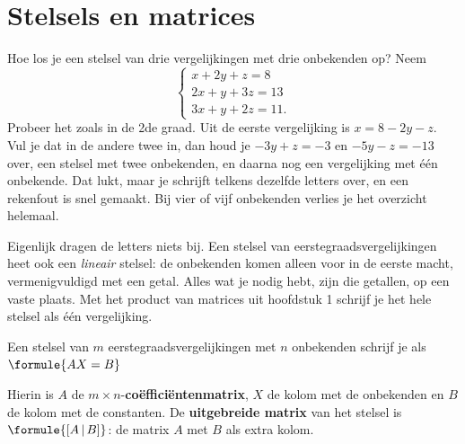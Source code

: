 \begin{oefeningen}[Start]

\end{oefeningen}


\section{Stelsels en matrices}

Hoe los je een stelsel van drie vergelijkingen met drie onbekenden op? Neem
\[ \begin{cases} x + 2y + z = 8 \\ 2x + y + 3z = 13 \\ 3x + y + 2z = 11 . \end{cases} \]
Probeer het zoals in de 2de graad. Uit de eerste vergelijking is $x = 8 - 2y - z$. Vul je dat in de andere twee in, dan houd je $-3y + z = -3$ en $-5y - z = -13$ over, een stelsel met twee onbekenden, en daarna nog een vergelijking met één onbekende. Dat lukt, maar je schrijft telkens dezelfde letters over, en een rekenfout is snel gemaakt. Bij vier of vijf onbekenden verlies je het overzicht helemaal.

Eigenlijk dragen de letters niets bij. Een stelsel van eerstegraadsvergelijkingen heet ook een \textit{lineair} stelsel: de onbekenden komen alleen voor in de eerste macht, vermenigvuldigd met een getal. Alles wat je nodig hebt, zijn die getallen, op een vaste plaats. Met het product van matrices uit hoofdstuk 1 schrijf je het hele stelsel als één vergelijking.

\begin{theorie}
Een stelsel van $m$ eerstegraadsvergelijkingen met $n$ onbekenden schrijf je als \quad $\formule{AX = B}$

\vspace{1mm}
Hierin is $A$ de $m \times n$-\textbf{\textcolor{accent}{coëfficiëntenmatrix}}, $X$ de kolom met de onbekenden en $B$ de kolom met de constanten. De \textbf{\textcolor{accent}{uitgebreide matrix}} van het stelsel is $\formule{[A \,|\, B]}$: de matrix $A$ met $B$ als extra kolom.
\end{theorie}

